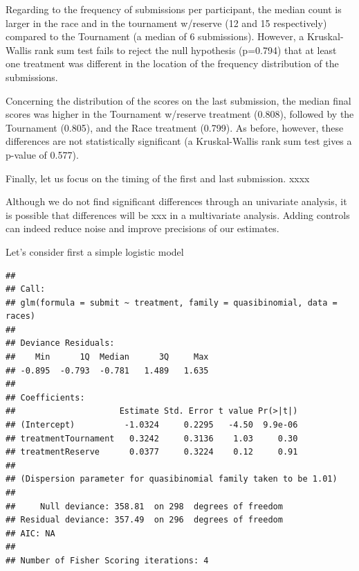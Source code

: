 \documentclass[12pt,]{article}
\begin{document}
Regarding to the frequency of submissions per participant, the median
count is larger in the race and in the tournament w/reserve (12 and 15
respectively) compared to the Tournament (a median of 6 submissions).
However, a Kruskal-Wallis rank sum test fails to reject the null
hypothesis (p=0.794) that at least one treatment was different in the
location of the frequency distribution of the submissions.

Concerning the distribution of the scores on the last submission, the
median final scores was higher in the Tournament w/reserve treatment
(0.808), followed by the Tournament (0.805), and the Race treatment
(0.799). As before, however, these differences are not statistically
significant (a Kruskal-Wallis rank sum test gives a p-value of 0.577).

Finally, let us focus on the timing of the first and last submission.
xxxx

Although we do not find significant differences through an univariate
analysis, it is possible that differences will be xxx in a multivariate
analysis. Adding controls can indeed reduce noise and improve precisions
of our estimates.

Let's consider first a simple logistic model

\begin{verbatim}
## 
## Call:
## glm(formula = submit ~ treatment, family = quasibinomial, data = races)
## 
## Deviance Residuals: 
##    Min      1Q  Median      3Q     Max  
## -0.895  -0.793  -0.781   1.489   1.635  
## 
## Coefficients:
##                     Estimate Std. Error t value Pr(>|t|)
## (Intercept)          -1.0324     0.2295   -4.50  9.9e-06
## treatmentTournament   0.3242     0.3136    1.03     0.30
## treatmentReserve      0.0377     0.3224    0.12     0.91
## 
## (Dispersion parameter for quasibinomial family taken to be 1.01)
## 
##     Null deviance: 358.81  on 298  degrees of freedom
## Residual deviance: 357.49  on 296  degrees of freedom
## AIC: NA
## 
## Number of Fisher Scoring iterations: 4
\end{verbatim}
\end{document}
